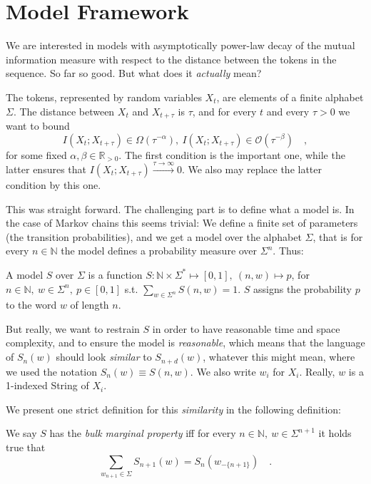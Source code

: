 \documentclass[../../main.tex]{subfiles}
\begin{document}
\section{Model Framework}
    We are interested in models with asymptotically power-law decay of the mutual information measure with respect to the distance between the tokens in the sequence. So far so good. But what does it \emph{actually} mean?

    The tokens, represented by random variables $X_t$, are elements of a finite alphabet $\Sigma$. The distance between $X_t$ and $X_{t + \tau}$ is $\tau$, and for every $t$ and every $\tau > 0$ we want to bound
    \[
        I(X_t; X_{t + \tau}) \in \Omega(\tau^{-\alpha}), \ I(X_t; X_{t + \tau}) \in \mathcal{O}(\tau^{-\beta}) \quad ,
    \]
    for some fixed $\alpha, \beta \in \mathbb{R}_{>0}$. The first condition is the important one, while the latter ensures that $I(X_t; X_{t + \tau}) \xrightarrow{\tau \to \infty} 0$. We also may replace the latter condition by this one.

    This was straight forward. The challenging part is to define what a  model is. In the case of Markov chains this seems trivial: We define a finite set of parameters (the transition probabilities), and we get a model over the alphabet $\Sigma$, that is for every $n \in \mathbb{N}$ the model defines a probability measure over $\Sigma^n$. Thus:

    \begin{definition}
        A model $S$ over $\Sigma$ is a function $S: \mathbb{N} \times \Sigma^* \mapsto [0, 1], \ (n, w) \mapsto p$, for $n \in \mathbb{N}, \ w \in \Sigma^n, \ p \in [0, 1]$ s.t. $\sum_{w \in \Sigma^n} S(n, w) = 1$. $S$ assigns the probability $p$ to the word $w$ of length $n$.
    \end{definition}

    But really, we want to restrain $S$ in order to have reasonable time and space complexity, and to ensure the model is \emph{reasonable}, which means that the language of $S_n(w)$ should look \emph{similar} to $S_{n + d}(w)$, whatever this might mean, where we used the notation $S_n(w) \equiv S(n, w)$. We also write $w_i$ for $X_i$. Really, $w$ is a 1-indexed String of $X_i$.  

    We present one strict definition for this \emph{similarity} in the following definition:

    \begin{definition}
        We say $S$ has the \emph{bulk marginal property} iff for every $n \in \mathbb{N}, \ w \in \Sigma^{n + 1}$ it holds true that
        \[
            \sum_{w_{n + 1} \in \Sigma} S_{n + 1}(w) = S_n(w_{-\{n + 1\}}) \quad .
        \]
    \end{definition}
\end{document}
